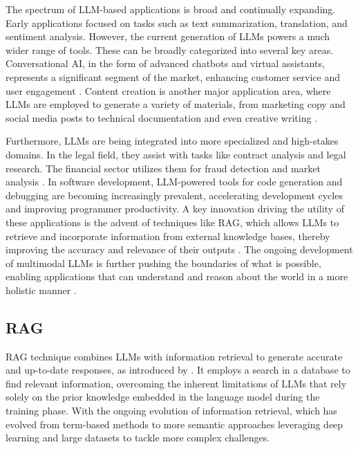             The spectrum of LLM-based applications is broad and continually expanding. Early applications focused on tasks such as text summarization, translation, and sentiment analysis. However, the current generation of LLMs powers a much wider range of tools. These can be broadly categorized into several key areas. Conversational AI, in the form of advanced chatbots and virtual assistants, represents a significant segment of the market, enhancing customer service and user engagement \citep{GrandViewResearch2025}. Content creation is another major application area, where LLMs are employed to generate a variety of materials, from marketing copy and social media posts to technical documentation and even creative writing \citep{V7Labs2025}.            
            
            Furthermore, LLMs are being integrated into more specialized and high-stakes domains. In the legal field, they assist with tasks like contract analysis and legal research. The financial sector utilizes them for fraud detection and market analysis \citep{V7Labs2025}. In software development, LLM-powered tools for code generation and debugging are becoming increasingly prevalent, accelerating development cycles and improving programmer productivity. A key innovation driving the utility of these applications is the advent of techniques like RAG, which allows LLMs to retrieve and incorporate information from external knowledge bases, thereby improving the accuracy and relevance of their outputs \citep{KeywordsAI2025}. The ongoing development of multimodal LLMs is further pushing the boundaries of what is possible, enabling applications that can understand and reason about the world in a more holistic manner \citep{Kaddour2023}.
        
        \subsection{RAG} 

            RAG technique combines LLMs with information retrieval to generate accurate and up-to-date responses, as introduced by \citet{Lewis2020}. 
            It employs a search in a database to find relevant information, overcoming the inherent limitations of LLMs that rely solely on the prior knowledge embedded in the language model during the training phase. 
            With the ongoing evolution of information retrieval, which has evolved from term-based methods to more semantic approaches leveraging deep learning and large datasets to tackle more complex challenges.
            
